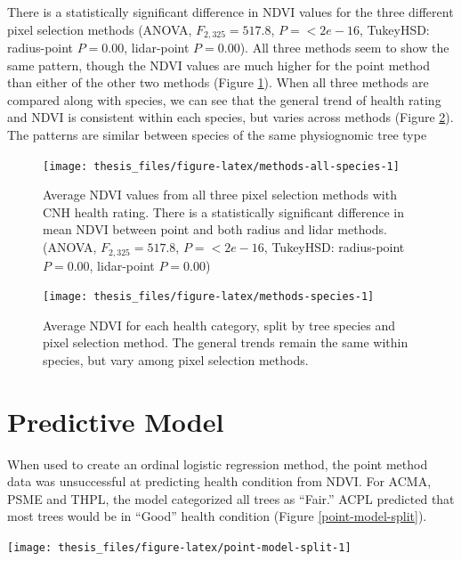 \documentclass[12pt,twoside]{reedthesis}
\begin{document}
There is a statistically significant difference in NDVI values for the three different pixel selection methods (ANOVA, \(F_{2, 325}=517.8\), \(P = <2e-16\), TukeyHSD: radius-point \(P = 0.00\), lidar-point \(P = 0.00\)). All three methods seem to show the same pattern, though the NDVI values are much higher for the point method than either of the other two methods (Figure \ref{fig:methods-all-species}). When all three methods are compared along with species, we can see that the general trend of health rating and NDVI is consistent within each species, but varies across methods (Figure \ref{fig:methods-species}). The patterns are similar between species of the same physiognomic tree type
\begin{figure}
\texttt{[image: thesis\_files/figure-latex/methods-all-species-1]} \caption[NDVI and health rating comparison across methods]{Average NDVI values from all three pixel selection methods with CNH health rating. There is a statistically significant difference in mean NDVI between point and both radius and lidar methods. (ANOVA, $F_{2, 325}=517.8$, $P = <2e-16$, TukeyHSD: radius-point $P = 0.00$, lidar-point $P = 0.00$)}\label{fig:methods-all-species}
\end{figure}
\begin{figure}
\texttt{[image: thesis\_files/figure-latex/methods-species-1]} \caption[Average NDVI comparison between species and methods.]{Average NDVI for each health category, split by tree species and pixel selection method. The general trends remain the same within species, but vary among pixel selection methods.}\label{fig:methods-species}
\end{figure}
\hypertarget{predictive-model}{%
\section{Predictive Model}\label{predictive-model}}

When used to create an ordinal logistic regression method, the point method data was unsuccessful at predicting health condition from NDVI. For ACMA, PSME and THPL, the model categorized all trees as ``Fair.'' ACPL predicted that most trees would be in ``Good'' health condition (Figure \ref{point-model-split}).

\texttt{[image: thesis\_files/figure-latex/point-model-split-1]}
\end{document}
